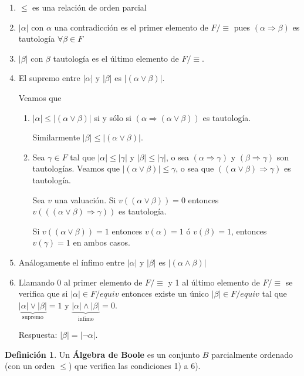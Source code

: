 \documentclass[a4paper,11pt]{article}
\theoremstyle{definition}
\newtheorem{defn}{Definición}[section]
\theoremstyle{remark}
\begin{document}
\begin{enumerate}
\item $\leq$ es una relación de orden parcial
\item $|\alpha|$ con $\alpha$ una contradicción es el primer elemento de $F / \equiv$ pues 
$(\alpha \Rightarrow \beta)$ es tautología $\forall \beta \in F$
\item $|\beta|$ con $\beta$ tautología es el último elemento de $F / \equiv$.
\item El supremo entre $|\alpha|$ y $|\beta|$ es $|(\alpha \vee \beta)|$.

Veamos que
\begin{enumerate}
\item $|\alpha| \leq |(\alpha \vee \beta)|$ si y sólo si $(\alpha \Rightarrow (\alpha \vee \beta))$
es tautología. 

Similarmente $|\beta| \leq |(\alpha \vee \beta)|$.
\item Sea $\gamma \in F$ tal que $|\alpha| \leq |\gamma|$ y $|\beta| \leq |\gamma|$, o sea
$(\alpha \Rightarrow \gamma)$ y $(\beta \Rightarrow \gamma)$ son tautologías. Veamos que
$|(\alpha \vee \beta)| \leq \gamma$, o sea que $((\alpha \vee \beta) \Rightarrow \gamma)$
es tautología.

Sea $v$ una valuación. Si $v((\alpha \vee \beta)) = 0$ entonces 
$v(((\alpha \vee \beta) \Rightarrow \gamma))$ es tautología.

Si $v((\alpha \vee \beta)) = 1$ entonces $v(\alpha) = 1$ ó $v(\beta) = 1$, entonces
$v(\gamma) = 1$ en ambos casos.
\end{enumerate}
\item Análogamente el ínfimo entre $|\alpha|$ y $|\beta|$ es $|(\alpha \wedge \beta)|$
\item Llamando 0 al primer elemento de $F/\equiv$ y 1 al último elemento de $F/\equiv$ se
verifica que si $|\alpha| \in F/equiv$ entonces existe un único $|\beta| \in F/equiv$ tal
que $\underbrace{|\alpha| \vee |\beta|}_{\text{supremo}} = 1$ y 
$\underbrace{|\alpha| \wedge |\beta|}_{\text{infimo}} = 0$.

Respuesta: $|\beta| = |\neg \alpha|$.
\end{enumerate}

\begin{defn}
Un \textbf{Álgebra de Boole} es un conjunto $B$ parcialmente ordenado (con un orden $\leq$) que verifica
las condiciones 1) a 6).
\end{defn}
\end{document}
